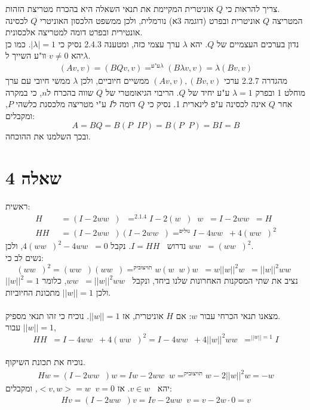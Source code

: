 \documentclass{article}
\DeclareMathOperator*{\equals}{=}
\DeclareMathOperator{\adj}{^\ast}
\DeclareMathOperator{\inv}{^{-1}}
\DeclareMathOperator{\perc}{^\perp}
\begin{document}
צריך להראות כי $Q$ אוניטרית המקיימת את תנאי השאלה היא בהכרח מטריצת הזהות. \\
המטריצה $Q$ אוניטרית ובפרט (דוגמה 3א) נורמלית, ולכן ממשפט הלכסון האוניטרי $Q$ לכסינה אונטירית ובפרט דומה למטריצה אלכסונית. \\
נדון בערכים העצמיים של $Q$. יהא $\lambda$ ערך עצמי כזה, ומטענה 2.4.3 נסיק כי $|\lambda|=1$. כמו כן יהא $v\ne 0$ וו"ע השייך ל$\lambda$.
\begin{align*}
    (Av,v)=(BQv,v)\equals^{\text{ע"ע} \lambda}(B\lambda v, v)=\lambda (Bv,v)
\end{align*}
מהגדרה 2.2.7 ערכי $(Av, v), (Bv,v)$ ממשיים חיוביים, ולכן $\lambda$ ממשי חיובי עם ערך מוחלט 1 ובפרק $\lambda=1$ ע"ע יחיד של $Q$.
הריבוי הגיאומטרי של $Q$ שווה בהכרח ל$n$, כי במקרה אחר $Q$ אינה לכסינה ע"פ לינארית 1. נסיק כי $Q$ דומה ל$I$ ע"י מטריצה מלכסנת כלשהי $P$, ומקבלים:
\[
    A=BQ=B(P\inv I P) = B(P\inv P)=BI=B
\]
ובכך השלמנו את ההוכחה.

\pagebreak

\section*{שאלה 4}

ראשית:
\begin{align*}
    H\adj  & = (I-2ww\adj) \adj \equals^{2.1.4}
    I - 2(w \adj) \adj w\adj = I - 2ww\adj = H            \\
    HH\adj & = (I - 2ww\adj)(I - 2ww\adj) \equals^{פילוג}
    I - 4ww\adj + 4 (ww\adj)^2
\end{align*}
נדרוש $I=HH\adj$. נקבל $4(ww\adj)^2 - 4ww\adj=0$, ולכן $ww\adj = (ww\adj)^2$. \\
נשים לב כי:
\[
    (ww\adj)^2=(ww\adj) (w w\adj)\equals^{קיבוציות}w(w\adj w)w\adj=w||w||^2w\adj = ||w||^2 ww\adj
\]
נציב את שתי המסקנות האחרונות שלנו ביחד, ונקבל $ww\adj = ||w||^2ww\adj$, כלומר $||w||^2=1$ ולכן $||w||=1$ מתכונת החיוביות.\\\\
מצאנו תנאי הכרחי עבור $w$: אם $H$ אוניטרית, אז $||w||=1$. נוכיח כי זהו תנאי מספיק.\\
עבור $||w||=1$,
\[
    HH\adj = I - 4ww\adj + 4 (ww\adj)^2=I-4ww\adj + 4||w||^2ww\adj \equals^{||w||=1}I
\]
\\
נוכיח את תכונת השיקוף.
\begin{align*}
    Hw=(I-2ww\adj)w=Iw-2ww\adj w \equals^{קיבוציות} w - 2||w||^2w=-w
\end{align*}
יהא $v\in {w}\perc$. אז $<v,w>=w\adj v = 0$, ומקבלים:
\begin{align*}
    Hv=(I-2ww\adj)v=Iv-2ww\adj v = v - 2w\cdot 0 = v
\end{align*}
\end{document}
